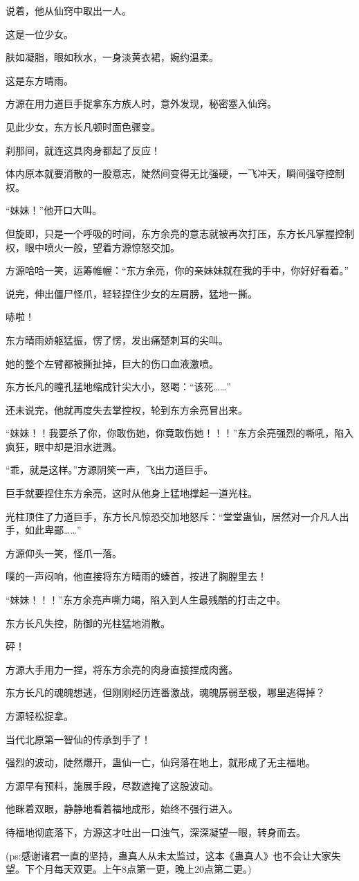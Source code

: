 \begin{this_body}
说着，他从仙窍中取出一人。

这是一位少女。

肤如凝脂，眼如秋水，一身淡黄衣裙，婉约温柔。

这是东方晴雨。

方源在用力道巨手捉拿东方族人时，意外发现，秘密塞入仙窍。

见此少女，东方长凡顿时面色骤变。

刹那间，就连这具肉身都起了反应！

体内原本就要消散的一股意志，陡然间变得无比强硬，一飞冲天，瞬间强夺控制权。

“妹妹！”他开口大叫。

但旋即，只是一个呼吸的时间，东方余亮的意志就被再次打压，东方长凡掌握控制权，眼中喷火一般，望着方源惊怒交加。

方源哈哈一笑，运筹帷幄：“东方余亮，你的亲妹妹就在我的手中，你好好看着。”

说完，伸出僵尸怪爪，轻轻捏住少女的左肩膀，猛地一撕。

哧啦！

东方晴雨娇躯猛振，愣了愣，发出痛楚刺耳的尖叫。

她的整个左臂都被撕扯掉，巨大的伤口血液激喷。

东方长凡的瞳孔猛地缩成针尖大小，怒喝：“该死……”

还未说完，他就再度失去掌控权，轮到东方余亮冒出来。

“妹妹！！我要杀了你，你敢伤她，你竟敢伤她！！！”东方余亮强烈的嘶吼，陷入疯狂，眼中却是泪水迸溅。

“乖，就是这样。”方源阴笑一声，飞出力道巨手。

巨手就要捏住东方余亮，这时从他身上猛地撑起一道光柱。

光柱顶住了力道巨手，东方长凡惊恐交加地怒斥：“堂堂蛊仙，居然对一介凡人出手，如此卑鄙……”

方源仰头一笑，怪爪一落。

噗的一声闷响，他直接将东方晴雨的螓首，按进了胸膛里去！

“妹妹！！！”东方余亮声嘶力竭，陷入到人生最残酷的打击之中。

东方长凡失控，防御的光柱猛地消散。

砰！

方源大手用力一捏，将东方余亮的肉身直接捏成肉酱。

东方长凡的魂魄想逃，但刚刚经历连番激战，魂魄孱弱至极，哪里逃得掉？

方源轻松捉拿。

当代北原第一智仙的传承到手了！

强烈的波动，陡然爆开，蛊仙一亡，仙窍落在地上，就形成了无主福地。

方源早有预料，施展手段，尽数遮掩了这股波动。

他眯着双眼，静静地看着福地成形，始终不强行进入。

待福地彻底落下，方源这才吐出一口浊气，深深凝望一眼，转身而去。

(ps:感谢诸君一直的坚持，蛊真人从未太监过，这本《蛊真人》也不会让大家失望。下个月每天双更。上午8点第一更，晚上20点第二更。)

\end{this_body}

